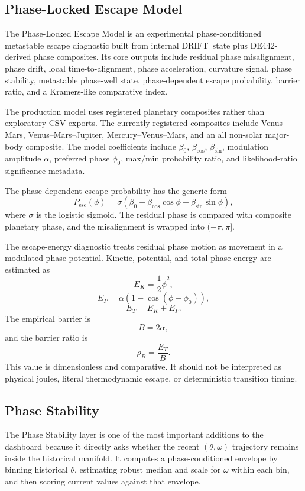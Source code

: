 \documentclass[11pt]{article}
\newcommand{\DRIFT}{\textsc{DRIFT}}
\begin{document}
\subsection{Phase-Locked Escape Model}
The Phase-Locked Escape Model is an experimental phase-conditioned metastable escape diagnostic built from internal \DRIFT\ state plus DE442-derived phase composites. Its core outputs include residual phase misalignment, phase drift, local time-to-alignment, phase acceleration, curvature signal, phase stability, metastable phase-well state, phase-dependent escape probability, barrier ratio, and a Kramers-like comparative index.

The production model uses registered planetary composites rather than exploratory CSV exports. The currently registered composites include Venus--Mars, Venus--Mars--Jupiter, Mercury--Venus--Mars, and an all non-solar major-body composite. The model coefficients include \(\beta_0\), \(\beta_{\cos}\), \(\beta_{\sin}\), modulation amplitude \(\alpha\), preferred phase \(\phi_0\), max/min probability ratio, and likelihood-ratio significance metadata.

The phase-dependent escape probability has the generic form
\[
P_{\mathrm{esc}}(\phi)=\sigma\left(\beta_0+\beta_{\cos}\cos\phi+\beta_{\sin}\sin\phi\right),
\]
where \(\sigma\) is the logistic sigmoid. The residual phase is compared with composite planetary phase, and the misalignment is wrapped into \((-\pi,\pi]\).

The escape-energy diagnostic treats residual phase motion as movement in a modulated phase potential. Kinetic, potential, and total phase energy are estimated as
\[
E_K=\frac{1}{2}\dot{\phi}^2,
\]
\[
E_P=\alpha\left(1-\cos(\phi-\phi_0)\right),
\]
\[
E_T=E_K+E_P.
\]
The empirical barrier is
\[
B=2\alpha,
\]
and the barrier ratio is
\[
\rho_B=\frac{E_T}{B}.
\]
This value is dimensionless and comparative. It should not be interpreted as physical joules, literal thermodynamic escape, or deterministic transition timing.

\subsection{Phase Stability}
The Phase Stability layer is one of the most important additions to the dashboard because it directly asks whether the recent \((\theta,\omega)\) trajectory remains inside the historical manifold. It computes a phase-conditioned envelope by binning historical \(\theta\), estimating robust median and scale for \(\omega\) within each bin, and then scoring current values against that envelope.
\end{document}
